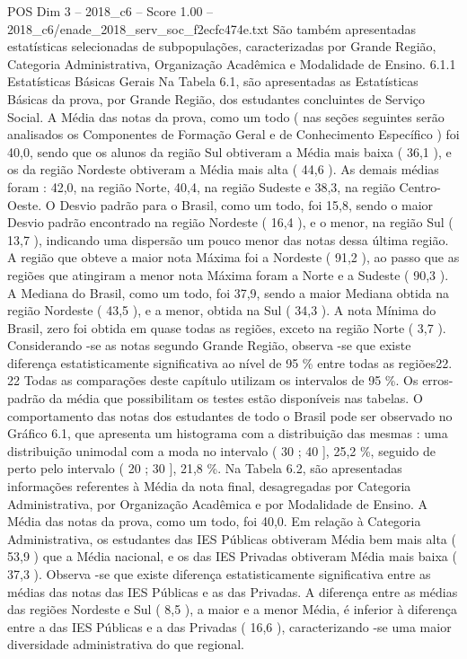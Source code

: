 \begin{textsample}{POS Dim 3 – 2018\_c6 – Score 1.00 – 2018\_c6/enade\_2018\_serv\_soc\_f2ecfc474e.txt}
São também apresentadas estatísticas selecionadas de subpopulações, caracterizadas por Grande Região, Categoria Administrativa, Organização Acadêmica e Modalidade de Ensino. 6.1.1 Estatísticas Básicas Gerais Na Tabela 6.1, são apresentadas as Estatísticas Básicas da prova, por Grande Região, dos estudantes concluintes de Serviço Social.
A Média das notas da prova, como um todo ( nas seções seguintes serão analisados os Componentes de Formação Geral e de Conhecimento Específico ) foi 40,0, sendo que os alunos da região Sul obtiveram a Média mais baixa ( 36,1 ), e os da região Nordeste obtiveram a Média mais alta ( 44,6 ).
As demais médias foram : 42,0, na região Norte, 40,4, na região Sudeste e 38,3, na região Centro-Oeste.
O Desvio padrão para o Brasil, como um todo, foi 15,8, sendo o maior Desvio padrão encontrado na região Nordeste ( 16,4 ), e o menor, na região Sul ( 13,7 ), indicando uma dispersão um pouco menor das notas dessa última região.
A região que obteve a maior nota Máxima foi a Nordeste ( 91,2 ), ao passo que as regiões que atingiram a menor nota Máxima foram a Norte e a Sudeste ( 90,3 ).
A Mediana do Brasil, como um todo, foi 37,9, sendo a maior Mediana obtida na região Nordeste ( 43,5 ), e a menor, obtida na Sul ( 34,3 ).
A nota Mínima do Brasil, zero foi obtida em quase todas as regiões, exceto na região Norte ( 3,7 ).
Considerando -se as notas segundo Grande Região, observa -se que existe diferença estatisticamente significativa ao nível de 95 \% entre todas as regiões22. 22 Todas as comparações deste capítulo utilizam os intervalos de 95 \%.
Os erros-padrão da média que possibilitam os testes estão disponíveis nas tabelas.
O comportamento das notas dos estudantes de todo o Brasil pode ser observado no Gráfico 6.1, que apresenta um histograma com a distribuição das mesmas : uma distribuição unimodal com a moda no intervalo ( 30 ; 40 ], 25,2 \%, seguido de perto pelo intervalo ( 20 ; 30 ], 21,8 \%.
Na Tabela 6.2, são apresentadas informações referentes à Média da nota final, desagregadas por Categoria Administrativa, por Organização Acadêmica e por Modalidade de Ensino.
A Média das notas da prova, como um todo, foi 40,0.
Em relação à Categoria Administrativa, os estudantes das IES Públicas obtiveram Média bem mais alta ( 53,9 ) que a Média nacional, e os das IES Privadas obtiveram Média mais baixa ( 37,3 ).
Observa -se que existe diferença estatisticamente significativa entre as médias das notas das IES Públicas e as das Privadas.
A diferença entre as médias das regiões Nordeste e Sul ( 8,5 ), a maior e a menor Média, é inferior à diferença entre a das IES Públicas e a das Privadas ( 16,6 ), caracterizando -se uma maior diversidade administrativa do que regional.

\end{textsample}
